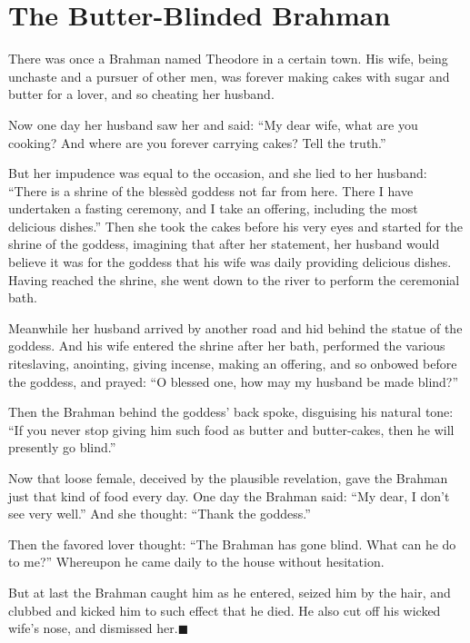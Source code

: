 \documentclass[article, twoside, 14pt]{memoir}
\newcommand{\qed}{\hfill \ensuremath{\blacksquare}}
\begin{document}
\chapter{The Butter-Blinded Brahman}

\label{s64}

There was once a Brahman named Theodore in a certain town. His
wife, being unchaste and a pursuer of other men, was forever making
cakes with sugar and butter for a lover, and so cheating her
husband.

Now one day her husband saw her and said:
``My dear wife, what are you cooking? And where are you forever carrying cakes? Tell the truth.''

But her impudence was equal to the occasion, and she lied to her
husband:
``There is a shrine of the blessèd goddess not far from here. There I have undertaken a fasting ceremony, and I take an offering, including the most delicious dishes.''
Then she took the cakes before his very eyes and started for the
shrine of the goddess, imagining that after her statement, her
husband would believe it was for the goddess that his wife was
daily providing delicious dishes. Having reached the shrine, she
went down to the river to perform the ceremonial bath.

Meanwhile her husband arrived by another road and hid behind the
statue of the goddess. And his wife entered the shrine after her
bath, performed the various rites{\textemdash}laving, anointing, giving
incense, making an offering, and so on{\textemdash}bowed before the goddess,
and prayed: ``O blessed one, how may my husband be made blind?''

Then the Brahman behind the goddess' back spoke, disguising his
natural tone:
``If you never stop giving him such food as butter and butter-cakes, then he will presently go blind.''

Now that loose female, deceived by the plausible revelation, gave
the Brahman just that kind of food every day. One day the Brahman
said: ``My dear, I don't see very well.'' And she thought:
``Thank the goddess.''

Then the favored lover thought:
``The Brahman has gone blind. What can he do to me?'' Whereupon he
came daily to the house without hesitation.

But at last the Brahman caught him as he entered, seized him by the
hair, and clubbed and kicked him to such effect that he died. He
also cut off his wicked wife's nose, and dismissed
her.\hyperref[s64]{\qed}
\end{document}
